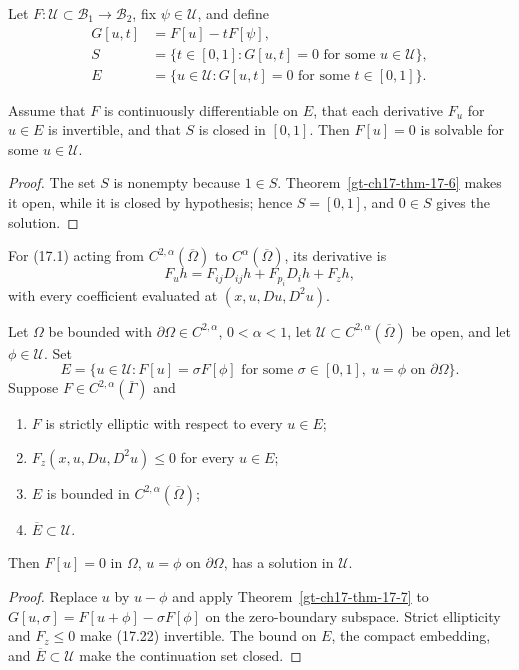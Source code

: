 Let $F:\mathcal U\subset\mathcal B_1\to\mathcal B_2$, fix
$\psi\in\mathcal U$, and define
\begin{equation}\tag{17.21}
\begin{aligned}
G[u,t]&=F[u]-tF[\psi],\\
S&=\{t\in[0,1]:G[u,t]=0\text{ for some }u\in\mathcal U\},\\
E&=\{u\in\mathcal U:G[u,t]=0\text{ for some }t\in[0,1]\}.
\end{aligned}
\end{equation}

\begin{theorem}\label{gt-ch17-thm-17-7}
Assume that $F$ is continuously differentiable on $E$, that each derivative
$F_u$ for $u\in E$ is invertible, and that $S$ is closed in $[0,1]$.  Then
$F[u]=0$ is solvable for some $u\in\mathcal U$.
\end{theorem}
\begin{proof}
\sketch The set $S$ is nonempty because $1\in S$.  Theorem~\ref{gt-ch17-thm-17-6} makes it
open, while it is closed by hypothesis; hence $S=[0,1]$, and $0\in S$ gives
the solution.
\end{proof}

For (17.1) acting from $C^{2,\alpha}(\overline\Omega)$ to
$C^\alpha(\overline\Omega)$, its derivative is
\begin{equation}\tag{17.22}
F_uh=F_{ij}D_{ij}h+F_{p_i}D_i h+F_zh,
\end{equation}
with every coefficient evaluated at $(x,u,Du,D^2u)$.

\begin{theorem}
\label{gt-ch17-thm-dirichlet-continuity}
Let $\Omega$ be bounded with $\partial\Omega\in C^{2,\alpha}$,
$0<\alpha<1$, let $\mathcal U\subset C^{2,\alpha}(\overline\Omega)$ be open,
and let $\phi\in\mathcal U$.  Set
\[
E=\{u\in\mathcal U:F[u]=\sigma F[\phi]\text{ for some }\sigma\in[0,1],
\ u=\phi\text{ on }\partial\Omega\}.
\]
Suppose $F\in C^{2,\alpha}(\overline\Gamma)$ and
\begin{enumerate}
\item[(i)] $F$ is strictly elliptic with respect to every $u\in E$;
\item[(ii)] $F_z(x,u,Du,D^2u)\le0$ for every $u\in E$;
\item[(iii)] $E$ is bounded in $C^{2,\alpha}(\overline\Omega)$;
\item[(iv)] $\overline E\subset\mathcal U$.
\end{enumerate}
Then $F[u]=0$ in $\Omega$, $u=\phi$ on $\partial\Omega$, has a solution in
$\mathcal U$.
\end{theorem}
\begin{proof}
\sketch Replace $u$ by $u-\phi$ and apply Theorem~\ref{gt-ch17-thm-17-7} to
$G[u,\sigma]=F[u+\phi]-\sigma F[\phi]$ on the zero-boundary subspace.
Strict ellipticity and $F_z\le0$ make (17.22) invertible.  The bound on $E$,
the compact embedding, and $\overline E\subset\mathcal U$ make the
continuation set closed.
\end{proof}

